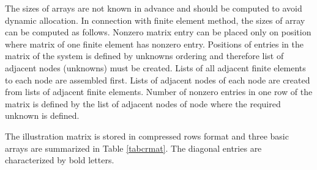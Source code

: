 The sizes of arrays are not known in advance and should be computed to avoid dynamic allocation.
In connection with finite element method, the sizes of array can be computed as follows. Nonzero
matrix entry can be placed only on position where matrix of one finite element has nonzero entry.
Positions of entries in the matrix of the system is defined by unknowns ordering and therefore
list of adjacent nodes (unknowns) must be created. Lists of all adjacent finite elements to each node
are assembled first. Lists of adjacent nodes of each node are created from lists of adjacent finite
elements. Number of nonzero entries in one row of the matrix is defined by the list of adjacent nodes
of node where the required unknown is defined.

The illustration matrix is stored in compressed rows format and three basic arrays are summarized
in Table \ref{tabcrmat}. The diagonal entries are characterized by bold letters.

